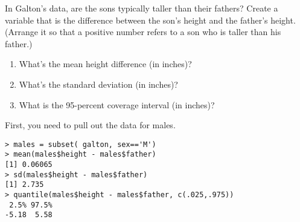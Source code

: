 
In Galton's data, are the sons typically taller than their fathers? 
Create a variable that is
the difference between the son's height and the father's height.
(Arrange it so that a positive number refers to a son who is taller
than his father.)

\begin{enumerate}
\item What's the mean height difference (in inches)?\\

\item What's the standard deviation (in inches)?\\

\item What is the 95-percent coverage interval (in inches)?
\begin{MultipleChoice}
\end{MultipleChoice}
\end{enumerate}

\begin{AnswerText}
First, you need to pull out the data for males.
\begin{verbatim}
> males = subset( galton, sex=='M')
> mean(males$height - males$father)
[1] 0.06065
> sd(males$height - males$father)
[1] 2.735
> quantile(males$height - males$father, c(.025,.975))
 2.5% 97.5% 
-5.18  5.58 
\end{verbatim}
\end{AnswerText}

